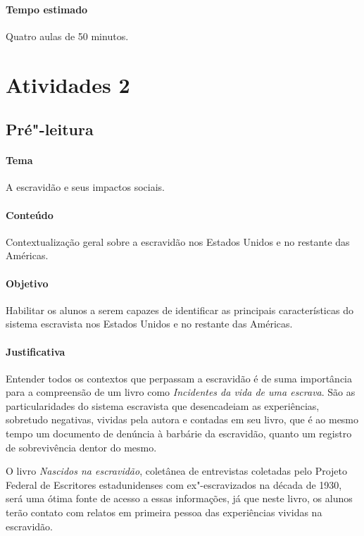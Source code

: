 \documentclass[11pt]{extarticle}
\begin{document}
 \paragraph{Tempo estimado} Quatro aulas de 50 minutos.



\section{Atividades 2}



\subsection{Pré"-leitura}

\paragraph{Tema} A escravidão e seus impactos sociais.

\paragraph{Conteúdo} Contextualização geral sobre a escravidão nos Estados Unidos e 
no restante das Américas.

\paragraph{Objetivo} Habilitar os alunos a serem capazes de identificar
as principais características do sistema escravista nos Estados Unidos e 
no restante das Américas.

\paragraph{Justificativa} Entender todos os contextos que perpassam
a escravidão é de suma importância para a compreensão de um livro
como \emph{Incidentes da vida de uma escrava}. São as particularidades
do sistema escravista que desencadeiam as experiências, sobretudo negativas,
vividas pela autora e contadas em seu livro, que é ao mesmo tempo
um documento de denúncia à barbárie da escravidão, quanto
um registro de sobrevivência dentor do mesmo. 


O livro \emph{Nascidos na escravidão}, coletânea de entrevistas coletadas
 pelo Projeto Federal de Escritores estadunidenses com ex"-escravizados 
 na década de 1930, será uma ótima fonte de acesso a essas informações,
 já que neste livro, os alunos terão contato com relatos em primeira
 pessoa das experiências vividas na escravidão. 
\end{document}
